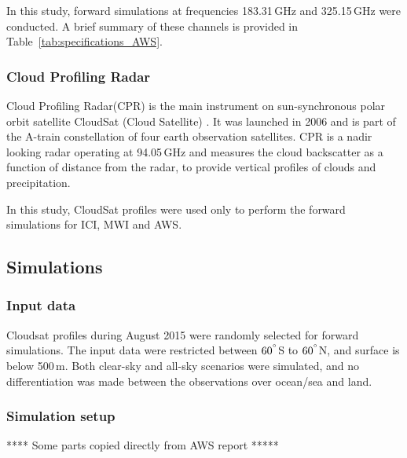 \documentclass[amt, manuscript]{copernicus}
\begin{document}
In this study, forward simulations at frequencies 183.31\,GHz and 325.15\,GHz were conducted. A brief summary of these channels is provided in Table~\ref{tab:specifications_AWS}.

\subsubsection{Cloud Profiling Radar}
%
Cloud Profiling Radar(CPR) is the main instrument on sun-synchronous polar orbit satellite CloudSat (Cloud Satellite) \citep{Stephens2002cloudsat}. It was launched in 2006 and is part of the A-train constellation of four earth observation satellites. CPR is a nadir looking radar operating at 94.05\,GHz and measures the cloud backscatter as a function of distance from the radar, to provide vertical profiles of clouds and precipitation.

In this study, CloudSat profiles were used only to perform the forward simulations for ICI, MWI and AWS. 

\subsection{Simulations}
\label{sec:arts_simulations}
%
\subsubsection{Input data}
%
Cloudsat profiles during August 2015 were randomly selected for forward simulations. The input data were restricted between $60^{^{\circ}}$S to $60^{^{\circ}}$N, and surface is below 500\,m. Both clear-sky and all-sky scenarios were simulated, and no differentiation was made between the observations over ocean/sea and land. 
\subsubsection{Simulation setup}
%
**** Some parts copied directly from AWS report *****
\end{document}
